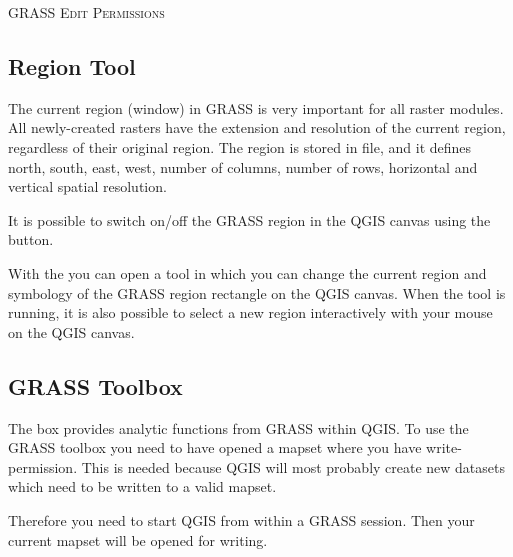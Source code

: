 \begin{Tip}\caption{\textsc{GRASS Edit Permissions}}
\end{Tip} 

\subsection{Region Tool}

The current region (window) in GRASS is very important for all 
raster modules. All newly-created rasters have the extension and resolution
of the current region, regardless of their original region. The region is
stored in  file, and it defines
north, south, east, west, number of columns, number of rows, 
horizontal and vertical spatial resolution.

It is possible to switch on/off the GRASS region in the QGIS canvas
using the  button. 

With the  you can open a tool 
in which you can change the current region and symbology
of the GRASS region rectangle on the QGIS canvas. When the tool is running,
it is also possible to select a new region interactively with your mouse
on the QGIS canvas.


\subsection{GRASS Toolbox}

The  box provides analytic
functions from GRASS within QGIS. To
use the GRASS toolbox you need to have opened a mapset where you have
write-permission. This is needed because QGIS will most probably create
new datasets which need to be written to a valid mapset.

Therefore you need to start QGIS from within a GRASS session. Then your 
current mapset will be opened for writing.

